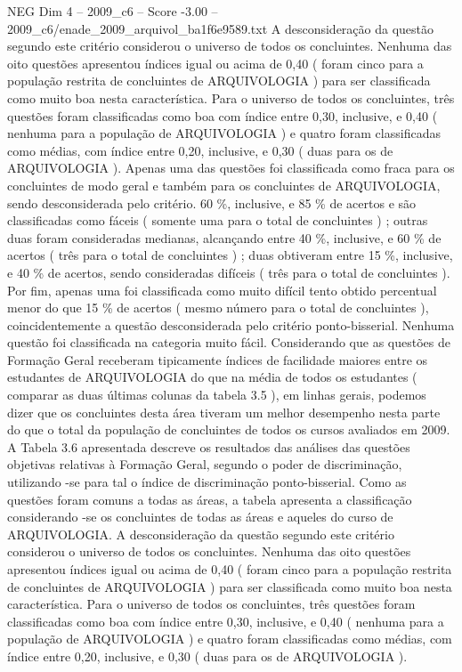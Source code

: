 \begin{textsample}{NEG Dim 4 – 2009\_c6 – Score -3.00 – 2009\_c6/enade\_2009\_arquivol\_ba1f6e9589.txt}
A desconsideração da questão segundo este critério considerou o universo de todos os concluintes.
Nenhuma das oito questões apresentou índices igual ou acima de 0,40 ( foram cinco para a população restrita de concluintes de ARQUIVOLOGIA ) para ser classificada como muito boa nesta característica.
Para o universo de todos os concluintes, três questões foram classificadas como boa com índice entre 0,30, inclusive, e 0,40 ( nenhuma para a população de ARQUIVOLOGIA ) e quatro foram classificadas como médias, com índice entre 0,20, inclusive, e 0,30 ( duas para os de ARQUIVOLOGIA ).
Apenas uma das questões foi classificada como fraca para os concluintes de modo geral e também para os concluintes de ARQUIVOLOGIA, sendo desconsiderada pelo critério. 60 \%, inclusive, e 85 \% de acertos e são classificadas como fáceis ( somente uma para o total de concluintes ) ; outras duas foram consideradas medianas, alcançando entre 40 \%, inclusive, e 60 \% de acertos ( três para o total de concluintes ) ; duas obtiveram entre 15 \%, inclusive, e 40 \% de acertos, sendo consideradas difíceis ( três para o total de concluintes ).
Por fim, apenas uma foi classificada como muito difícil tento obtido percentual menor do que 15 \% de acertos ( mesmo número para o total de concluintes ), coincidentemente a questão desconsiderada pelo critério ponto-bisserial.
Nenhuma questão foi classificada na categoria muito fácil.
Considerando que as questões de Formação Geral receberam tipicamente índices de facilidade maiores entre os estudantes de ARQUIVOLOGIA do que na média de todos os estudantes ( comparar as duas últimas colunas da tabela 3.5 ), em linhas gerais, podemos dizer que os concluintes desta área tiveram um melhor desempenho nesta parte do que o total da população de concluintes de todos os cursos avaliados em 2009.
A Tabela 3.6 apresentada descreve os resultados das análises das questões objetivas relativas à Formação Geral, segundo o poder de discriminação, utilizando -se para tal o índice de discriminação ponto-bisserial.
Como as questões foram comuns a todas as áreas, a tabela apresenta a classificação considerando -se os concluintes de todas as áreas e aqueles do curso de ARQUIVOLOGIA.
A desconsideração da questão segundo este critério considerou o universo de todos os concluintes.
Nenhuma das oito questões apresentou índices igual ou acima de 0,40 ( foram cinco para a população restrita de concluintes de ARQUIVOLOGIA ) para ser classificada como muito boa nesta característica.
Para o universo de todos os concluintes, três questões foram classificadas como boa com índice entre 0,30, inclusive, e 0,40 ( nenhuma para a população de ARQUIVOLOGIA ) e quatro foram classificadas como médias, com índice entre 0,20, inclusive, e 0,30 ( duas para os de ARQUIVOLOGIA ).

\end{textsample}
